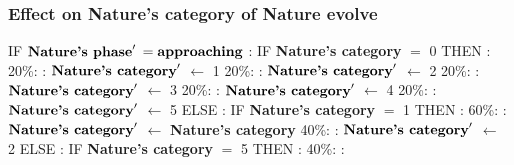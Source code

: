 \documentclass{article}%
\begin{document}
\subsubsection{Effect on Nature's category of Nature evolve}%
\label{ssubsec:Effect on Nature's category of Nature evolve}%
\begin{flushleft}%
IF %
$\mbox{\textbf{Nature's phase}} '$%
\linebreak%
\hspace*{2em}%
$= \mbox{\textbf{approaching}}$%
: %
IF %
\textbf{Nature's category}%
$=$%
0%
\linebreak%
\hspace*{4em}%
THEN %
: %
\linebreak%
\hspace*{6em}%
20\%:%
: %
$\mbox{\textbf{Nature's category}} '$%
$\leftarrow$%
1%
\linebreak%
\hspace*{6em}%
20\%:%
: %
$\mbox{\textbf{Nature's category}} '$%
$\leftarrow$%
2%
\linebreak%
\hspace*{6em}%
20\%:%
: %
$\mbox{\textbf{Nature's category}} '$%
$\leftarrow$%
3%
\linebreak%
\hspace*{6em}%
20\%:%
: %
$\mbox{\textbf{Nature's category}} '$%
$\leftarrow$%
4%
\linebreak%
\hspace*{6em}%
20\%:%
: %
$\mbox{\textbf{Nature's category}} '$%
$\leftarrow$%
5%
\linebreak%
\hspace*{4em}%
ELSE %
: %
IF %
\textbf{Nature's category}%
$=$%
1%
\linebreak%
\hspace*{6em}%
THEN %
: %
\linebreak%
\hspace*{8em}%
60\%:%
: %
$\mbox{\textbf{Nature's category}} '$%
$\leftarrow$%
\textbf{Nature's category}%
\linebreak%
\hspace*{8em}%
40\%:%
: %
$\mbox{\textbf{Nature's category}} '$%
$\leftarrow$%
2%
\linebreak%
\hspace*{6em}%
ELSE %
: %
IF %
\textbf{Nature's category}%
$=$%
5%
\linebreak%
\hspace*{8em}%
THEN %
: %
\linebreak%
\hspace*{10em}%
40\%:%
: %

\end{flushleft}
\end{document}
